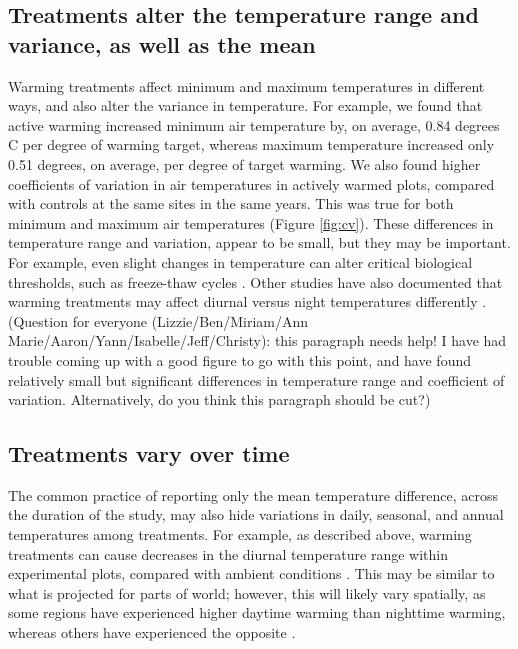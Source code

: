 \documentclass{article}
\begin{document}
\subsection* {Treatments alter the temperature range and variance, as well as the mean}
Warming treatments affect minimum and maximum temperatures in different ways, and also alter the variance in temperature. For example, we found that active warming increased minimum air temperature by, on average, 0.84 degrees C per degree of warming target, whereas maximum temperature increased only 0.51 degrees, on average, per degree of target warming. We also found higher coefficients of variation in air temperatures in actively warmed plots, compared with controls at the same sites in the same years. This was true for both minimum and maximum air temperatures (Figure \ref{fig:cv}). These differences in temperature range and variation, appear to be small, but they may be important. For example, even slight changes in temperature can alter critical biological thresholds, such as freeze-thaw cycles \citep{mcdaniel2014}. Other studies have also documented that warming treatments may affect diurnal versus night temperatures differently \citep{shen2016,matthews2016}. (Question for everyone (Lizzie/Ben/Miriam/Ann Marie/Aaron/Yann/Isabelle/Jeff/Christy): this paragraph needs help! I have had trouble coming up with a good figure to go with this point, and have found relatively small but significant differences in temperature range and coefficient of variation. Alternatively, do you think this paragraph should be cut?) 
\subsection* {Treatments vary over time}
The common practice of reporting only the mean temperature difference, across the duration of the study, may also hide variations in daily, seasonal, and annual temperatures among treatments. For example, as described above, warming treatments can cause decreases in the diurnal temperature range within experimental plots, compared with ambient conditions \citep{hoeppner2012}. This may be similar to what is projected for parts of world; however, this will likely vary spatially, as some regions have experienced higher daytime warming than nighttime warming, whereas others have experienced the opposite \citep{ipcc2013}. 
\end{document}
